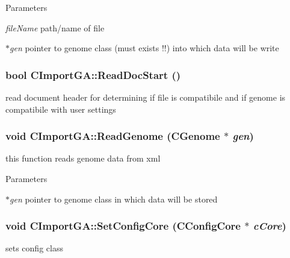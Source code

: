 \begin{DoxyParams}{Parameters}
\item[{\em fileName}]path/name of file \item[{\em $\ast$gen}]pointer to genome class (must exists !!) into which data will be write \end{DoxyParams}
\hypertarget{classCImportGA_add157c36e5436ea5e433a5aa1eeca605}{
\subsubsection[{ReadDocStart}]{\setlength{\rightskip}{0pt plus 5cm}bool CImportGA::ReadDocStart ()}}
\label{classCImportGA_add157c36e5436ea5e433a5aa1eeca605}
read document header for determining if file is compatibile and if genome is compatibile with user settings \hypertarget{classCImportGA_a31342a1ba9bdae4a94575bf5733d1b45}{
\subsubsection[{ReadGenome}]{\setlength{\rightskip}{0pt plus 5cm}void CImportGA::ReadGenome ({\bf CGenome} $\ast$ {\em gen})}}
\label{classCImportGA_a31342a1ba9bdae4a94575bf5733d1b45}
this function reads genome data from xml


\begin{DoxyParams}{Parameters}
\item[{\em $\ast$gen}]pointer to genome class in which data will be stored \end{DoxyParams}
\hypertarget{classCImportGA_a30c6e30805279b7e795895d64a05852d}{
\subsubsection[{SetConfigCore}]{\setlength{\rightskip}{0pt plus 5cm}void CImportGA::SetConfigCore ({\bf CConfigCore} $\ast$ {\em cCore})}}
\label{classCImportGA_a30c6e30805279b7e795895d64a05852d}
sets config class


